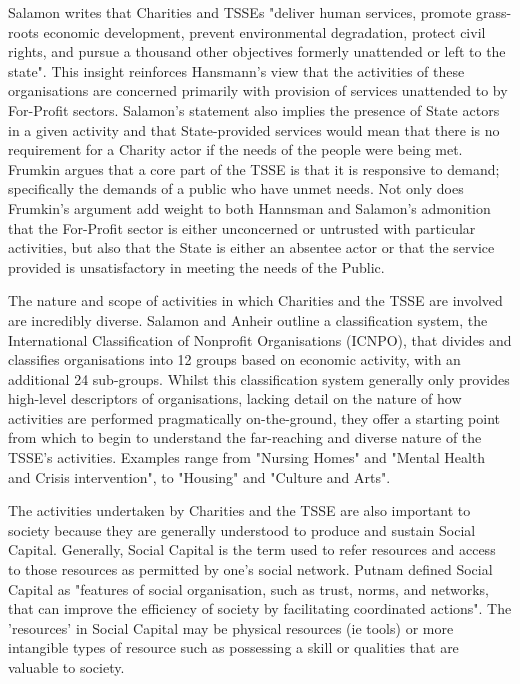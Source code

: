 Salamon writes that Charities and TSSEs "deliver human services, promote grass-roots economic development, prevent environmental degradation, protect civil rights, and pursue a thousand other objectives formerly unattended or left to the state". This insight reinforces Hansmann's view that the activities of these organisations are concerned primarily with provision of services unattended to by For-Profit sectors. Salamon's statement also implies the presence of State actors in a given activity and that State-provided services would mean that there is no requirement for a Charity actor if the needs of the people were being met. Frumkin argues that a core part of the TSSE is that it is responsive to demand; specifically the demands of a public who have unmet needs. Not only does Frumkin's argument add weight to both Hannsman and Salamon's admonition that the For-Profit sector is either unconcerned or untrusted with particular activities, but also that the State is either an absentee actor or that the service provided is unsatisfactory in meeting the needs of the Public.

The nature and scope of activities in which Charities and the TSSE are involved are incredibly diverse. Salamon and Anheir outline a classification system, the International Classification of Nonprofit Organisations (ICNPO), that divides and classifies organisations into 12 groups based on economic activity, with an additional 24 sub-groups. Whilst this classification system generally only provides high-level descriptors of organisations, lacking detail on the nature of how activities are performed pragmatically on-the-ground, they offer a starting point from which to begin to understand the far-reaching and diverse nature of the TSSE's activities. Examples range from "Nursing Homes" and "Mental Health and Crisis intervention", to "Housing" and "Culture and Arts".

The activities undertaken by Charities and the TSSE are also important to society because they are generally understood to produce and sustain Social Capital. Generally, Social Capital is the term used to refer resources and access to those resources as permitted by one's social network. Putnam defined Social Capital as "features of social organisation, such as trust, norms, and networks, that can improve the efficiency of society by facilitating coordinated actions". The 'resources' in Social Capital may be physical resources (ie tools) or more intangible types of resource such as possessing a skill or qualities that are valuable to society.

